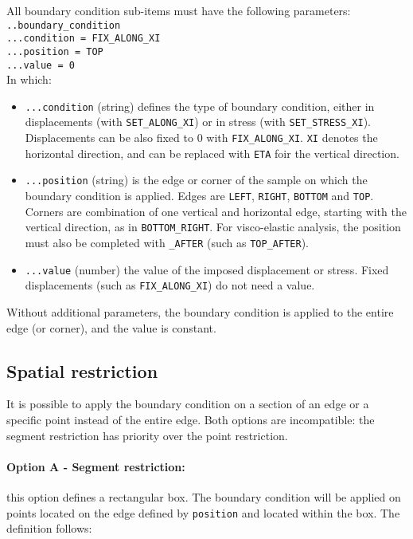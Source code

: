 \documentclass[10pt]{article}
\begin{document}
All boundary condition sub-items must have the following parameters:\\

\noindent \verb+..boundary_condition+\\
\verb+...condition = FIX_ALONG_XI+\\
\verb+...position = TOP+\\
\verb+...value = 0+\\

In which:

\begin{itemize}[label=]
	\item \verb+...condition+ (string) defines the type of boundary condition, either in displacements (with \verb+SET_ALONG_XI+) or in stress (with \verb+SET_STRESS_XI+).
Displacements can be also fixed to 0 with \verb+FIX_ALONG_XI+.
\verb+XI+ denotes the horizontal direction, and can be replaced with \verb+ETA+ foir the vertical direction.
	\item \verb+...position+ (string) is the edge or corner of the sample on which the boundary condition is applied.
Edges are \verb+LEFT+, \verb+RIGHT+, \verb+BOTTOM+ and \verb+TOP+.
Corners are combination of one vertical and horizontal edge, starting with the vertical direction, as in \verb+BOTTOM_RIGHT+.
For visco-elastic analysis, the position must also be completed with \verb+_AFTER+ (such as \verb+TOP_AFTER+).
	\item \verb+...value+ (number) the value of the imposed displacement or stress.
Fixed displacements (such as \verb+FIX_ALONG_XI+) do not need a value.
\end{itemize}

Without additional parameters, the boundary condition is applied to the entire edge (or corner), and the value is constant.

\subsection{Spatial restriction}

It is possible to apply the boundary condition on a section of an edge or a specific point instead of the entire edge.
Both options are incompatible: the segment restriction has priority over the point restriction.

\paragraph{Option A - Segment restriction:} this option defines a rectangular box.
The boundary condition will be applied on points located on the edge defined by \verb+position+ and located within the box.
The definition follows:\\
\end{document}
